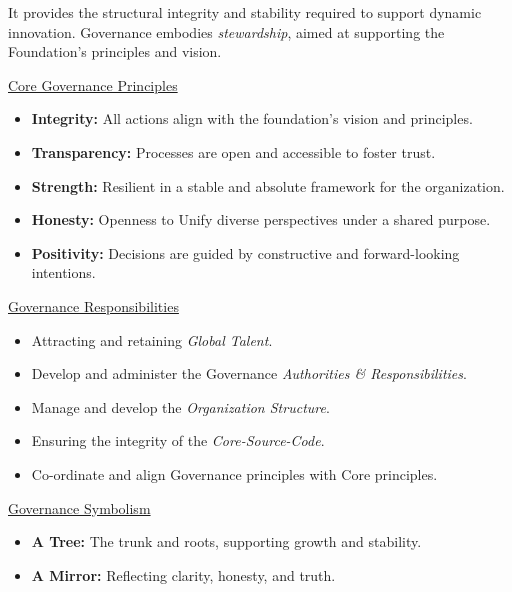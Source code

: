 \documentclass[twocolumn,10pt]{article}
\begin{document}
It provides the structural integrity and stability required to support dynamic innovation.
Governance embodies \textit{stewardship}, aimed at supporting the Foundation's principles and vision.

\vspace{20pt}
\begin{minipage}{0.95\linewidth}
    \begin{tcolorbox}
        \begin{center}\underline{Core Governance Principles}\end{center}
        \begin{itemize}
            \item \textbf{Integrity:} All actions align with the foundation's vision and principles.
            \item \textbf{Transparency:} Processes are open and accessible to foster trust.
            \item \textbf{Strength:} Resilient in a stable and absolute framework for the organization.
            \item \textbf{Honesty:} Openness to Unify diverse perspectives under a shared purpose.
            \item \textbf{Positivity:} Decisions are guided by constructive and forward-looking intentions.
        \end{itemize}

        \begin{center}\underline{Governance Responsibilities}\end{center}
        \begin{itemize}
            \item Attracting and retaining \textit{Global Talent}.
            \item Develop and administer the Governance \textit{Authorities \& Responsibilities}.
            \item Manage and develop the \textit{Organization Structure}.
            \item Ensuring the integrity of the \textit{Core-Source-Code}.
            \item Co-ordinate and align Governance principles with Core principles.
        \end{itemize}

        \begin{center}\underline{Governance Symbolism}\end{center}
        \begin{itemize}
            \item \textbf{A Tree:} The trunk and roots, supporting growth and stability.
            \item \textbf{A Mirror:} Reflecting clarity, honesty, and truth.
        \end{itemize}
    \end{tcolorbox}
\end{minipage}
\end{document}
